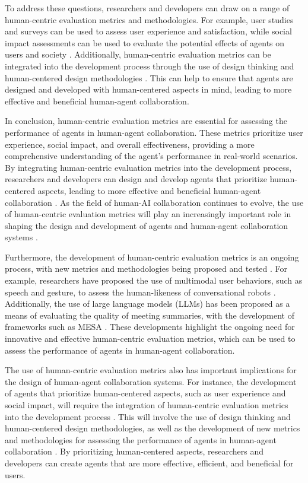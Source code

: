 \documentclass[11pt]{article}
\begin{document}
To address these questions, researchers and developers can draw on a range of human-centric evaluation metrics and methodologies. For example, user studies and surveys can be used to assess user experience and satisfaction, while social impact assessments can be used to evaluate the potential effects of agents on users and society \cite{ref215}. Additionally, human-centric evaluation metrics can be integrated into the development process through the use of design thinking and human-centered design methodologies \cite{ref216}. This can help to ensure that agents are designed and developed with human-centered aspects in mind, leading to more effective and beneficial human-agent collaboration.

In conclusion, human-centric evaluation metrics are essential for assessing the performance of agents in human-agent collaboration. These metrics prioritize user experience, social impact, and overall effectiveness, providing a more comprehensive understanding of the agent's performance in real-world scenarios. By integrating human-centric evaluation metrics into the development process, researchers and developers can design and develop agents that prioritize human-centered aspects, leading to more effective and beneficial human-agent collaboration \cite{ref210}. As the field of human-AI collaboration continues to evolve, the use of human-centric evaluation metrics will play an increasingly important role in shaping the design and development of agents and human-agent collaboration systems \cite{ref217}.

Furthermore, the development of human-centric evaluation metrics is an ongoing process, with new metrics and methodologies being proposed and tested \cite{ref218}. For example, researchers have proposed the use of multimodal user behaviors, such as speech and gesture, to assess the human-likeness of conversational robots \cite{ref219}. Additionally, the use of large language models (LLMs) has been proposed as a means of evaluating the quality of meeting summaries, with the development of frameworks such as MESA \cite{ref220}. These developments highlight the ongoing need for innovative and effective human-centric evaluation metrics, which can be used to assess the performance of agents in human-agent collaboration.

The use of human-centric evaluation metrics also has important implications for the design of human-agent collaboration systems. For instance, the development of agents that prioritize human-centered aspects, such as user experience and social impact, will require the integration of human-centric evaluation metrics into the development process \cite{ref213}. This will involve the use of design thinking and human-centered design methodologies, as well as the development of new metrics and methodologies for assessing the performance of agents in human-agent collaboration \cite{ref216}. By prioritizing human-centered aspects, researchers and developers can create agents that are more effective, efficient, and beneficial for users.
\end{document}
